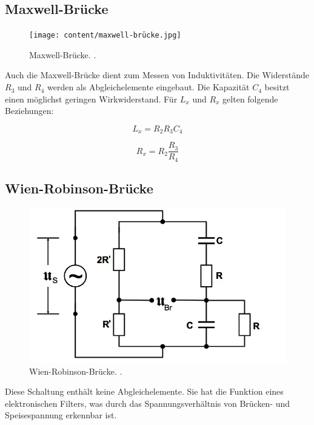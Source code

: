 \subsection{Maxwell-Brücke}

\begin{figure}
  \centering
  \texttt{[image: content/maxwell-brücke.jpg]}
  \caption{Maxwell-Brücke. \cite{anleitung302}.}
  \label{fig:maxwell}
\end{figure}

Auch die Maxwell-Brücke dient zum Messen von Induktivitäten. Die Widerstände $R_3$ und $R_4$ werden als Abgleichelemente eingebaut. Die Kapazität $C_4$ besitzt einen möglichst geringen Wirkwiderstand. Für $L_x$ und $R_x$ gelten folgende Beziehungen:

\begin{equation}
  \label{eqn:max1}
  L_x = R_{2} R_3 C_4
\end{equation}

\begin{equation}
  \label{eqn:max2}
  R_x = R_{2} \frac {R_3}{R_4}
\end{equation}

\subsection{Wien-Robinson-Brücke}

\begin{figure}
  \centering
  \includegraphics[scale=0.5]{content/wien-robinson.jpg}
  \caption{Wien-Robinson-Brücke. \cite{anleitung302}.}
  \label{fig:wien-robinson}
\end{figure}

Diese Schaltung enthält keine Abgleichelemente. Sie hat die Funktion eines elektronischen Filters, was durch das Spannungsverhältnis von Brücken- und Speisespannung erkennbar ist.



